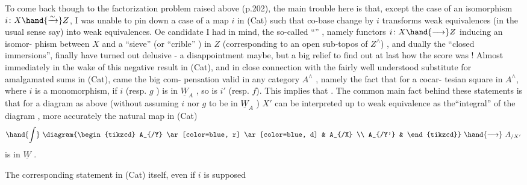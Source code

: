 To come back though to the factorization problem raised above (p.202),
the main trouble here is that, except the case of an isomorphism $i\colon X\hand{\xrightarrow{\sim}}Z$,
I was unable to pin down a  case of a  map $i$ in (Cat) such that
co-base change by $i$ transforms weak equivalences (in the usual sense say)
into weak equivalences. Oe candidate I had in mind, the so-called
``\hand{\uline{\textcolor{black}{open immersions}}}'' ,  namely functors $i\colon X\hand{\longrightarrow}Z$ inducing an isomor-%
phism between $X$ and a ``sieve'' (or ``crible'' ) in $Z$ (corresponding to an
open sub-topos of $Z^{\wedge}$) , and dually the ``closed immersions'', finally have
turned out delusive - a disappointment maybe, but  a big relief to find
out at last how the score was ! Almost immediately in the wake of this
negative result in (Cat), and in close connection with the fairly well
understood \hand{$\int$} substitute for amalgamated sums in (Cat), came the big com-%
pensation valid in any category $A^{\wedge}$ , namely the fact that for a cocar-%
tesian square
in $A^{\wedge}$, where $i$ is a monomorphism, if $i$ (resp. $g$ ) is in $\underline{W}_A$ , so is
$i'$ (resp. $f$). This implies that 
\hand{\uline{\textcolor{black}{transforms weak equivalences into weak equivalences}}}. The common main fact
behind these statements is that for a diagram as above (without assuming
$i$ nor $g$ to be in $\underline{W}_A$ )\hand{,} $X'$ can be interpreted up to weak equivalence as
the``integral'' of the diagram
,
more accurately\hand{,} the natural map in (Cat)
\[\hand{\int}\ \diagram{\begin{tikzcd}
A_{/Y} \ar[color=blue, r] \ar[color=blue, d] & A_{/X} \\
A_{/Y'} &
\end{tikzcd}}\ \hand{\longrightarrow}\ A_{/X'}\]
is in $\underline{W}$ .

The corresponding statement in (Cat) itself, even if $i$ is supposed

